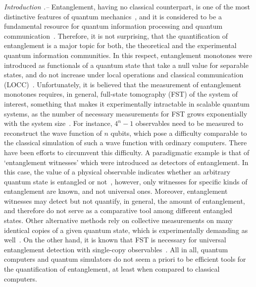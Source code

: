 \documentclass[10pt,nofootinbib,notitlepage,twocolumn,superscriptaddress]{revtex4-1}
\theoremstyle{plain}
\theoremstyle{definition}
\begin{document}
{\it{Introduction .--}} Entanglement, having no classical counterpart, is one of the most distinctive features of quantum mechanics~\cite{Amico_ent,Horodecki_ent}, and it is considered to be a fundamental resource for quantum information processing and quantum communication~\cite{chuang}.  Therefore, it is not surprising, that the quantification of entanglement is a major topic for both, the theoretical and the experimental quantum information communities.  In this respect, entanglement monotones were introduced as functionals of a quantum state that take a null value for separable states, and do not increase under local operations and classical communication (LOCC)~\cite{Vidal99}. Unfortunately, it is believed that the measurement of entanglement monotones requires, in general, full-state tomography (FST) of the system of interest, something that makes it experimentally intractable in scalable quantum systems, as the number of necessary measurements for FST grows exponentially with the system size~\cite{cramer,jullien,daweixin}. For instance,  $4^n-1$ observables need to be measured to reconstruct the wave function of $n$ qubits, which pose a difficulty comparable to the classical simulation of such a wave function with ordinary computers. There have been efforts to circumvent this difficulty. A paradigmatic example is that of `entanglement witnesses' which were introduced as detectors of entanglement. In this case, the value of a physical observable indicates whether an arbitrary quantum state is entangled or not~\cite{park}, however, only witnesses for specific kinds of entanglement are known, and not universal ones. Moreover, entanglement witnesses may detect but not quantify, in general, the amount of entanglement, and therefore do not serve as a comparative tool among different entangled states. Other alternative methods rely on collective measurements on many identical copies of a given quantum state, which is experimentally demanding as well~\cite{Bovino,Huber}. On the other hand, it is known that FST is necessary for universal entanglement detection with single-copy observables~\cite{xindawei}. All in all, quantum computers and quantum simulators do not seem a priori to be efficient tools for the quantification of entanglement, at least when compared to classical computers.
\end{document}
